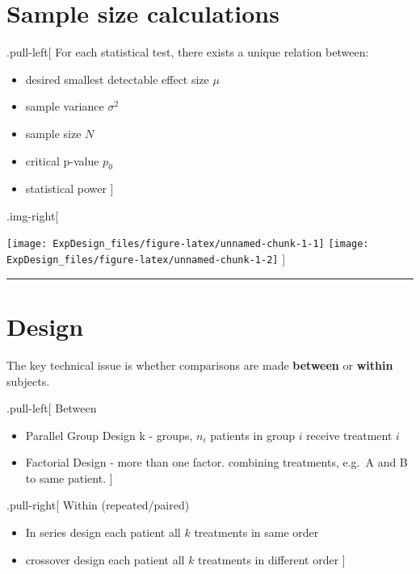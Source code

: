 \documentclass[]{article}
\providecommand{\tightlist}{%
  \setlength{\itemsep}{0pt}\setlength{\parskip}{0pt}}
\begin{document}
\hypertarget{sample-size-calculations}{%
\section{Sample size calculations}\label{sample-size-calculations}}

.pull-left{[} For each statistical test, there exists a unique relation
between:

\begin{itemize}
\tightlist
\item
  desired smallest detectable effect size \(\mu\)
\item
  sample variance \(\sigma^2\)
\item
  sample size \(N\)
\item
  critical p-value \(p_0\)
\item
  statistical power {]}
\end{itemize}

.img-right{[}

\texttt{[image: ExpDesign\_files/figure-latex/unnamed-chunk-1-1]}
\texttt{[image: ExpDesign\_files/figure-latex/unnamed-chunk-1-2]}
{]}

\begin{center}\rule{0.5\linewidth}{\linethickness}\end{center}

\hypertarget{design}{%
\section{Design}\label{design}}

The key technical issue is whether comparisons are made \textbf{between}
or \textbf{within} subjects.

.pull-left{[} Between

\begin{itemize}
\tightlist
\item
  Parallel Group Design k - groups, \(n_i\) patients in group \(i\)
  receive treatment \(i\)
\item
  Factorial Design - more than one factor. combining treatments, e.g.~A
  and B to same patient. {]}
\end{itemize}

.pull-right{[} Within (repeated/paired)

\begin{itemize}
\tightlist
\item
  In series design each patient all \(k\) treatments in same order
\item
  crossover design each patient all \(k\) treatments in different order
  {]}
\end{itemize}
\end{document}
